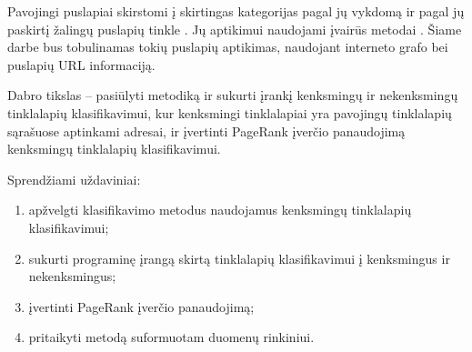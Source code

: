 Pavojingi puslapiai skirstomi į skirtingas kategorijas pagal jų vykdomą \cite{tax} ir pagal jų paskirtį žalingų puslapių tinkle \cite{linchpins}. Jų aptikimui naudojami įvairūs metodai \cite{comp}. Šiame darbe bus tobulinamas tokių puslapių aptikimas, naudojant interneto grafo bei puslapių URL informaciją.

Dabro tikslas -- pasiūlyti metodiką ir sukurti įrankį kenksmingų ir nekenksmingų tinklalapių klasifikavimui, kur kenksmingi tinklalapiai yra pavojingų tinklalapių sąrašuose aptinkami adresai, ir įvertinti PageRank įverčio panaudojimą kenksmingų tinklalapių klasifikavimui.

Sprendžiami uždaviniai:
\begin{enumerate}
    \item apžvelgti klasifikavimo metodus naudojamus kenksmingų tinklalapių klasifikavimui;
    \item sukurti programinę įrangą skirtą tinklalapių klasifikavimui į kenksmingus ir nekenksmingus;
    \item įvertinti PageRank įverčio panaudojimą;
    \item pritaikyti metodą suformuotam duomenų rinkiniui.
\end{enumerate}